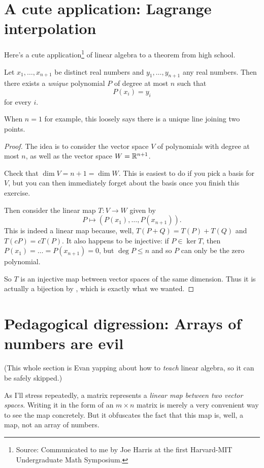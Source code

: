 \section{A cute application: Lagrange interpolation}
Here's a cute application\footnote{Source: Communicated to me
by Joe Harris at the first Harvard-MIT Undergraduate Math Symposium.}
of linear algebra to a theorem from high school.
\begin{theorem}
	Let $x_1, \dots, x_{n+1}$ be distinct real numbers
	and $y_1, \dots, y_{n+1}$ any real numbers.
	Then there exists a \emph{unique}
	polynomial $P$ of degree at most $n$
	such that \[ P(x_i) = y_i \] for every $i$.
\end{theorem}
When $n = 1$ for example, this loosely
says there is a unique line joining two points.
\begin{proof}
	The idea is to consider the vector space $V$
	of polynomials with degree at most $n$,
	as well as the vector space $W = \mathbb R^{n+1}$.
	\begin{ques}
		Check that $\dim V = n + 1 = \dim W$.
		This is easiest to do if you pick a basis for $V$,
		but you can then immediately forget about the basis
		once you finish this exercise.
	\end{ques}
	Then consider the linear map $T \colon V \to W$ given by
	\[ P \mapsto \left( P(x_1), \dots, P(x_{n+1}) \right). \]
	This is indeed a linear map because,
	well, $T(P+Q) = T(P)+T(Q)$ and $T(cP) = cT(P)$.
	It also happens to be injective: if $P \in \ker T$,
	then $P(x_1) = \dots = P(x_{n+1}) = 0$,
	but $\deg P \le n$ and so $P$ can only be the zero polynomial.

	So $T$ is an injective map between vector spaces of the same dimension.
	Thus it is actually a bijection by , which is exactly what we wanted.
\end{proof}

\section{Pedagogical digression: Arrays of numbers are evil}
\label{sec:basis_evil}

(This whole section is Evan yapping about how to \emph{teach} linear algebra,
so it can be safely skipped.)

As I'll stress repeatedly, a matrix represents a
\emph{linear map between two vector spaces}.
Writing it in the form of an $m \times n$ matrix
is merely a very convenient way to see the map concretely.
But it obfuscates the fact that this map is,
well, a map, not an array of numbers.

